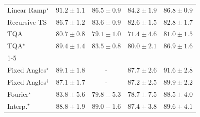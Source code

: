 \begin{tabular}{l|cccc|}
Linear Ramp$^\star$ & {\cellcolor[HTML]{00472A}} \color[HTML]{F1F1F1} $91.2\pm 1.1$ & {\cellcolor[HTML]{026A38}} \color[HTML]{F1F1F1} $86.5\pm 0.9$ & {\cellcolor[HTML]{14783E}} \color[HTML]{F1F1F1} $84.2\pm 1.9$ & {\cellcolor[HTML]{006837}} \color[HTML]{F1F1F1} $86.8\pm 0.9$ \\
Recursive TS & {\cellcolor[HTML]{016937}} \color[HTML]{F1F1F1} $86.7\pm 1.2$ & {\cellcolor[HTML]{187B3F}} \color[HTML]{F1F1F1} $83.6\pm 0.9$ & {\cellcolor[HTML]{208242}} \color[HTML]{F1F1F1} $82.6\pm 1.5$ & {\cellcolor[HTML]{1F8142}} \color[HTML]{F1F1F1} $82.8\pm 1.7$ \\
TQA & {\cellcolor[HTML]{2D914B}} \color[HTML]{F1F1F1} $80.7\pm 0.8$ & {\cellcolor[HTML]{379E54}} \color[HTML]{F1F1F1} $79.1\pm 1.0$ & {\cellcolor[HTML]{88CD7F}} \color[HTML]{000000} $71.4\pm 4.6$ & {\cellcolor[HTML]{2B8E4A}} \color[HTML]{F1F1F1} $81.0\pm 1.5$ \\
TQA$^\star$ & {\cellcolor[HTML]{005530}} \color[HTML]{F1F1F1} $89.4\pm 1.4$ & {\cellcolor[HTML]{197C40}} \color[HTML]{F1F1F1} $83.5\pm 0.8$ & {\cellcolor[HTML]{31974F}} \color[HTML]{F1F1F1} $80.0\pm 2.1$ & {\cellcolor[HTML]{006837}} \color[HTML]{F1F1F1} $86.9\pm 1.6$ \\
\cline{1-5}
\multicolumn{5}{c}{\rule{0pt}{8pt}SV} \\
\midrule
Fixed Angles$^\star$ & {\cellcolor[HTML]{034A74}} \color[HTML]{F1F1F1} $89.1\pm 1.8$ & {\cellcolor[HTML]{000000}} \color[HTML]{F1F1F1} {\cellcolor{white}} \color{black} - & {\cellcolor[HTML]{045483}} \color[HTML]{F1F1F1} $87.7\pm 2.6$ & {\cellcolor[HTML]{023858}} \color[HTML]{F1F1F1} $91.6\pm 2.8$ \\
Fixed Angles$^\dagger$ & {\cellcolor[HTML]{04588A}} \color[HTML]{F1F1F1} $87.1\pm 1.7$ & {\cellcolor[HTML]{000000}} \color[HTML]{F1F1F1} {\cellcolor{white}} \color{black} - & {\cellcolor[HTML]{04588A}} \color[HTML]{F1F1F1} $87.2\pm 2.5$ & {\cellcolor[HTML]{03446A}} \color[HTML]{F1F1F1} $89.9\pm 2.2$ \\
Fourier$^\star$ & {\cellcolor[HTML]{0569A4}} \color[HTML]{F1F1F1} $83.8\pm 5.6$ & {\cellcolor[HTML]{1E80B8}} \color[HTML]{F1F1F1} $79.8\pm 5.3$ & {\cellcolor[HTML]{2A88BC}} \color[HTML]{F1F1F1} $78.7\pm 7.5$ & {\cellcolor[HTML]{034E7B}} \color[HTML]{F1F1F1} $88.5\pm 4.0$ \\
Interp.$^\star$ & {\cellcolor[HTML]{034C78}} \color[HTML]{F1F1F1} $88.8\pm 1.9$ & {\cellcolor[HTML]{034A74}} \color[HTML]{F1F1F1} $89.0\pm 1.6$ & {\cellcolor[HTML]{045687}} \color[HTML]{F1F1F1} $87.4\pm 3.8$ & {\cellcolor[HTML]{03466E}} \color[HTML]{F1F1F1} $89.6\pm 4.1$ \\

\end{tabular}
